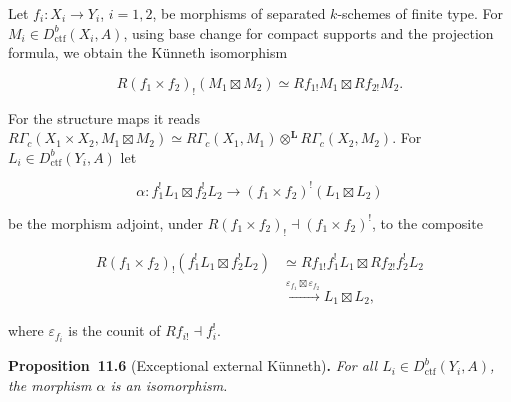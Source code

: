 \documentclass[11pt]{article}
\newenvironment{bpstatement}[2]{\par\addvspace{0.6\baselineskip}\noindent\textbf{#1}#2\textbf{.}\enspace\ignorespaces}
  {\par\addvspace{0.4\baselineskip}}
\newenvironment{bpstatementit}[2]{\begin{bpstatement}{#1}{#2}\itshape\ignorespaces}{\end{bpstatement}}
\begin{document}
Let \(f_i:X_i\to Y_i\), \(i=1,2\), be morphisms of separated \(k\)-schemes of finite type. For \(M_i\in D^b_{\mathrm{ctf}}(X_i,A)\), using base change for compact supports and the projection formula, we obtain the Künneth isomorphism

\[
R(f_1\times f_2)_!(M_1\boxtimes M_2)
\simeq Rf_{1!}M_1\boxtimes Rf_{2!}M_2.
\]

For the structure maps it reads \(R\Gamma_c(X_1\times X_2,M_1\boxtimes M_2)\simeq R\Gamma_c(X_1,M_1)\otimes^{\mathbf L} R\Gamma_c(X_2,M_2)\). For \(L_i\in D^b_{\mathrm{ctf}}(Y_i,A)\) let

\[
\alpha:f_1^!L_1\boxtimes f_2^!L_2\longrightarrow
(f_1\times f_2)^!(L_1\boxtimes L_2)
\]

be the morphism adjoint, under \(R(f_1\times f_2)_!\dashv(f_1\times f_2)^!\), to the composite

\[
\begin{aligned}
R(f_1\times f_2)_!(f_1^!L_1\boxtimes f_2^!L_2)
&\simeq Rf_{1!}f_1^!L_1\boxtimes Rf_{2!}f_2^!L_2\\
&\xrightarrow{\varepsilon_{f_1}\boxtimes\varepsilon_{f_2}}
L_1\boxtimes L_2,
\end{aligned}
\]

where \(\varepsilon_{f_i}\) is the counit of \(Rf_{i!}\dashv f_i^!\).

\label{bp188}%
\begin{bpstatementit}{Proposition~11.6}{ (Exceptional external Künneth)}
For all \(L_i\in D^b_{\mathrm{ctf}}(Y_i,A)\), the morphism \(\alpha\) is an isomorphism.
\end{bpstatementit}
\end{document}
